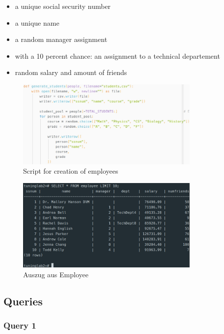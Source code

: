 \documentclass[11pt]{scrartcl}
\begin{document}
\begin{itemize}
    \item a unique social security number
    \item a unique name
    \item a random manager assignment
    \item with a 10 percent chance: an assignment to a technical departement
    \item random salary and amount of friends
\end{itemize}

\begin{figure}[htbp]
    \centering
    \includegraphics[width=0.8\textwidth]{Pics/ScriptEmployee.jpg}
    \caption{Script for creation of employees}
    \label{fig:ScriptEmployee}
\end{figure}

\begin{figure}[htbp]
    \centering
    \includegraphics[width=0.8\textwidth]{Pics/EmployeeResult.jpg}
    \caption{Auszug aus Employee}
    \label{fig:EmployeeResult}
\end{figure}

\subsection*{Queries}

\subsubsection*{Query 1}
\end{document}
